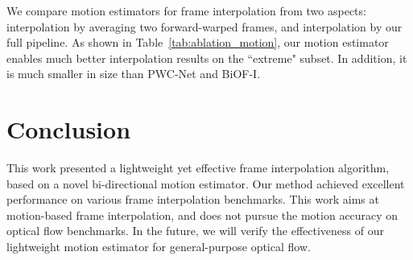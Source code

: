 \documentclass[10pt,twocolumn,letterpaper]{article}
\begin{document}
We compare motion estimators for frame interpolation from two aspects:
interpolation by averaging two forward-warped frames, and interpolation by our
full pipeline. As shown in Table~\ref{tab:ablation_motion}, our motion estimator
enables much better interpolation results on the ``extreme" subset. In addition,
it is much smaller in size than PWC-Net and BiOF-I.






\section{Conclusion}

This work presented a lightweight yet effective frame interpolation algorithm,
based on a novel bi-directional motion estimator. Our method achieved
excellent performance on various frame interpolation benchmarks. This work
aims at motion-based frame interpolation, and does not pursue the motion
accuracy on optical flow benchmarks. In the future, we will verify the
effectiveness of our lightweight motion estimator for general-purpose optical
flow.


{\small


}
\end{document}
